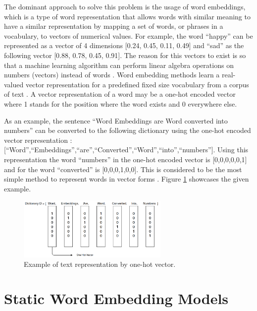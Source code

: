     \par The dominant approach to solve this problem is the usage of word embeddings, which is a type of word representation that allows words with similar meaning to have a similar representation by mapping a set of words, or phrases in a vocabulary, to vectors of numerical values. For example, the word “happy” can be represented as a vector of 4 dimensions [0.24, 0.45, 0.11, 0.49] and “sad” as the following vector [0.88, 0.78, 0.45, 0.91]. The reason for this vectors to exist is so that a machine learning algorithm can perform linear algebra operations on numbers (vectors) instead of words \cite{MuratMustafa}. Word embedding methods learn a real-valued vector representation for a predefined fixed size vocabulary from a corpus  of text \cite{Brownlee2017}. A vector representation of a word may be a one-hot encoded vector where 1 stands for the position where the word exists and 0 everywhere else. 
    
    \par As an example, the sentence ``Word Embeddings are Word converted into numbers” can be converted to the following dictionary using the one-hot encoded vector representation : [``Word”,``Embeddings”,``are”,``Converted”,``Word”,``into”,``numbers”]. Using this representation the word ``numbers” in the one-hot encoded vector is [0,0,0,0,0,1] and for the word ``converted” is [0,0,0,1,0,0]. This is considered to be the most simple method to represent words in vector forms \cite{Vidhya2017}. Figure \ref{fig:onehott} showcases the given example.
    
    
    \begin{figure}[H]
        \centering
        \captionsetup{justification=centering}
        \includegraphics[width=0.65\textwidth]{Sections/3StateOfTheArt/3_images/one_hot_encoding.png}
        \caption{Example of text representation by one-hot vector.}   
        \label{fig:onehott}
    \end{figure}
    
    
    



    \section{Static Word Embedding Models}
    \label{sec:static}

